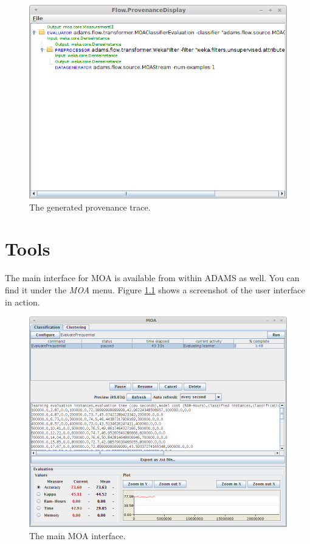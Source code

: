 \documentclass[a4paper]{book}
\begin{document}
\begin{figure}[htb]
  \centering
  \includegraphics[width=12.0cm]{images/provenance-output.png}
  \caption{The generated provenance trace.}
  \label{provenance-output}
\end{figure}

\chapter{Tools}
The main interface for MOA is available from within ADAMS as well. You can
find it under the \textit{MOA} menu. Figure \ref{moa-gui} shows a screenshot
of the user interface in action.
\begin{figure}[htb]
  \centering
  \includegraphics[width=12.0cm]{images/moa-gui.png}
  \caption{The main MOA interface.}
  \label{moa-gui}
\end{figure}



\end{document}
